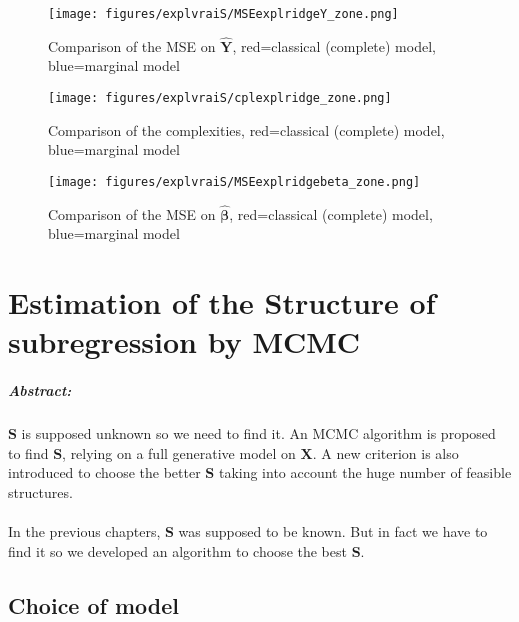 \documentclass[12pt,a4paper]{report}
\begin{document}
\begin{figure}[h!]
	\centering
		  \texttt{[image: figures/explvraiS/MSEexplridgeY\_zone.png]}
		\caption{Comparison of the MSE on $\hat{\boldsymbol{Y}}$, red=classical (complete) model, blue=marginal model}\label{MSEexplridgeY_zone}
	\end{figure}
	\begin{figure}[h!]
	\centering
		  \texttt{[image: figures/explvraiS/cplexplridge\_zone.png]}
		\caption{Comparison of the complexities, red=classical (complete) model, blue=marginal model}\label{cplexplridge_zone}
	\end{figure}
	\begin{figure}[h!]
	\centering
		  \texttt{[image: figures/explvraiS/MSEexplridgebeta\_zone.png]}
		\caption{Comparison of the MSE on $\hat{\boldsymbol{\beta}}$, red=classical (complete) model, blue=marginal model}\label{MSEexplridgebeta_zone}
	\end{figure}
	\FloatBarrier

\chapter{Estimation of the Structure of subregression by MCMC}\label{chapterMCMC}
\paragraph{Abstract:} $\boldsymbol{S}$ is supposed unknown so we need to find it. An MCMC algorithm is proposed to find $\boldsymbol{S}$, relying on a full generative model on $\boldsymbol{X}$. A new criterion is also introduced to choose the better $\boldsymbol{S}$ taking into account the huge number of feasible structures.
 \\
\\
In the previous chapters, $\boldsymbol{S}$ was supposed to be known. But in fact we have to find it so we developed an algorithm to choose the best $\boldsymbol{S}$.
\section{Choice of model}
\end{document}
